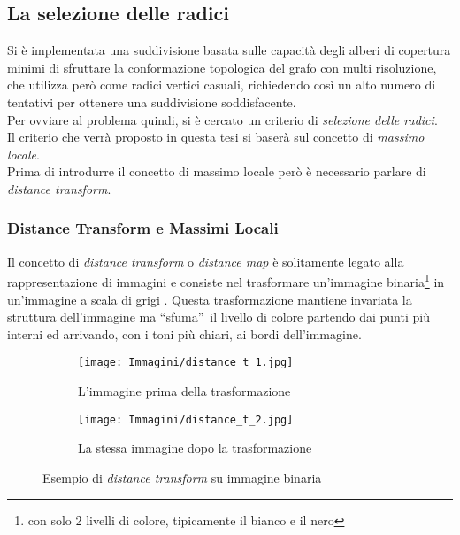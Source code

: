 {\subsection{La selezione delle radici}
Si è implementata una suddivisione basata sulle capacità degli alberi di copertura minimi di sfruttare la conformazione topologica del grafo con multi risoluzione, che utilizza però come radici vertici casuali, richiedendo così un alto numero di tentativi per ottenere una suddivisione soddisfacente.\\
Per ovviare al problema quindi, si è cercato un criterio di \emph{selezione delle radici}.\\
Il criterio che verrà proposto in questa tesi si baserà sul concetto di \emph{massimo locale}.\\
Prima di introdurre il concetto di massimo locale però è necessario parlare di \emph{distance transform}.

\subsubsection{Distance Transform e Massimi Locali}\label{subsubsec:local_max_map_transf}
Il concetto di \textit{distance transform} o \textit{distance map} è solitamente legato alla rappresentazione di immagini e consiste nel trasformare un'immagine binaria\footnote{con solo 2 livelli di colore, tipicamente il bianco e il nero} in un'immagine a scala di grigi \cite{distance_transform}. Questa trasformazione mantiene invariata la struttura dell'immagine ma \textquotedblleft sfuma\textquotedblright~il livello di colore partendo dai punti più interni ed arrivando, con i toni più chiari, ai bordi dell'immagine.
\begin{figure}[H]
	\centering
	\begin{subfigure}{0.5\textwidth}
	\centering
	\texttt{[image: Immagini/distance\_t\_1.jpg]}
	\caption{L'immagine prima della trasformazione}
	\end{subfigure}%
	\begin{subfigure}{0.5\textwidth}
	\centering
	\texttt{[image: Immagini/distance\_t\_2.jpg]}
	\caption{La stessa immagine dopo la trasformazione}
    \end{subfigure}
	\caption{Esempio di \textit{distance transform} su immagine binaria}
	\label{fig:map_transform_example}
\end{figure}

}
